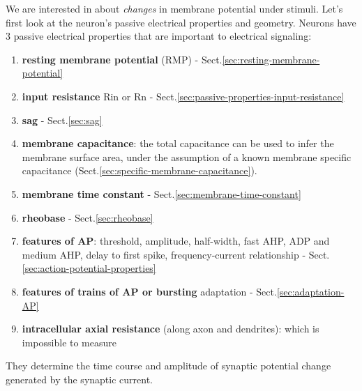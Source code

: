 We are interested in about {\it changes} in membrane potential under stimuli.
Let's first look at the neuron's passive electrical properties and geometry.
Neurons have 3 passive electrical properties that are important to electrical
signaling:
\begin{enumerate}
  \item {\bf resting membrane potential} (RMP) - Sect.\ref{sec:resting-membrane-potential}
  
  \item {\bf input resistance} Rin or Rn - Sect.\ref{sec:passive-properties-input-resistance}
  
  \item {\bf sag} - Sect.\ref{sec:sag}
  
  \item {\bf membrane capacitance}: the total capacitance can be used to infer
  the membrane surface area, under the assumption of a known membrane specific
  capacitance (Sect.\ref{sec:specific-membrane-capacitance}).
  
  \item {\bf membrane time constant} - Sect.\ref{sec:membrane-time-constant}

  \item {\bf rheobase} - Sect.\ref{sec:rheobase}
   
  \item {\bf features of AP}: threshold, amplitude, half-width, fast AHP, ADP
  and medium AHP, delay to first spike, frequency-current relationship -
  Sect.\ref{sec:action-potential-properties} 

  \item {\bf features of trains of AP or bursting}
  adaptation - Sect.\ref{sec:adaptation-AP}
  
  \item {\bf intracellular axial resistance} (along axon and dendrites): which
  is impossible to measure

\end{enumerate}
They determine the time course and amplitude of synaptic potential change
generated by the synaptic current.

